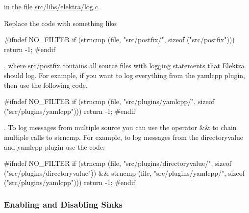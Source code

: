 in the file {\ttfamily \hyperlink{log_8c}{src/libs/elektra/log.\+c}}.


\begin{DoxyEnumerate}
\item Replace the code with something like\+:
\end{DoxyEnumerate}


\begin{DoxyCode}
\textcolor{preprocessor}{#ifndef NO\_FILTER}
     \textcolor{keywordflow}{if} (strncmp (file, \textcolor{stringliteral}{"src/postfix/"}, \textcolor{keyword}{sizeof} (\textcolor{stringliteral}{"src/postfix"}))) \textcolor{keywordflow}{return} -1;
\textcolor{preprocessor}{#endif}
\end{DoxyCode}


, where {\ttfamily src/postfix} contains all source files with logging statements that Elektra should log. For example, if you want to log everything from the {\ttfamily yamlcpp} plugin, then use the following code.


\begin{DoxyCode}
\textcolor{preprocessor}{#ifndef NO\_FILTER}
     \textcolor{keywordflow}{if} (strncmp (file, \textcolor{stringliteral}{"src/plugins/yamlcpp/"}, \textcolor{keyword}{sizeof} (\textcolor{stringliteral}{"src/plugins/yamlcpp"}))) \textcolor{keywordflow}{return} -1;
\textcolor{preprocessor}{#endif}
\end{DoxyCode}


. To log messages from multiple source you can use the operator {\ttfamily \&\&} to chain multiple calls to {\ttfamily strncmp}. For example, to log messages from the {\ttfamily directoryvalue} and {\ttfamily yamlcpp} plugin use the code\+:


\begin{DoxyCode}
\textcolor{preprocessor}{#ifndef NO\_FILTER}
     \textcolor{keywordflow}{if} (strncmp (file, \textcolor{stringliteral}{"src/plugins/directoryvalue/"}, \textcolor{keyword}{sizeof} (\textcolor{stringliteral}{"src/plugins/directoryvalue"})) &&
         strncmp (file, \textcolor{stringliteral}{"src/plugins/yamlcpp/"}, \textcolor{keyword}{sizeof} (\textcolor{stringliteral}{"src/plugins/yamlcpp"})))
             \textcolor{keywordflow}{return} -1;
\textcolor{preprocessor}{#endif}
\end{DoxyCode}


\subsubsection*{Enabling and Disabling Sinks}

